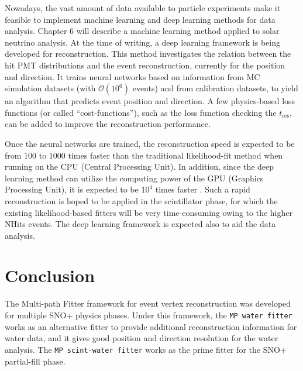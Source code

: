 Nowadays, the vast amount of data available to particle experiments make it feasible to implement machine learning and deep learning methods for data analysis. Chapter 6 will describe a machine learning method applied to solar neutrino analysis. At the time of writing, a deep learning framework is being developed for reconstruction\cite{markMachineLearning,markNeuralTalk,markNeuralNetwork}. This method investigates the relation between the hit PMT distributions and the event reconstruction, currently for the position and direction. It trains neural networks based on information from MC simulation datasets (with $\mathcal{O}(10^6)$ events) and from calibration datasets, to yield an algorithm that predicts event position and direction\cite{markNeuralTalk}. A few physics-based loss functions (or called ``cost-functions''), such as the loss function checking the $t_\mathrm{res}$, can be added to improve the reconstruction performance\cite{markNeuralTalk}. 

Once the neural networks are trained, the reconstruction speed is expected to be from 100 to 1000 times faster than the traditional likelihood-fit method when running on the CPU (Central Processing Unit). In addition, since the deep learning method can utilize the computing power of the GPU (Graphics Processing Unit), it is expected to be $10^4$ times faster \cite{markNeuralTalk,markNeuralNetwork}. Such a rapid reconstruction is hoped to be applied in the scintillator phase, for which the existing likelihood-based fitters will be very time-consuming owing to the higher NHits events. The deep learning framework is expected also to aid the data analysis.

\section{Conclusion}

The Multi-path Fitter framework for event vertex reconstruction was developed for multiple SNO+ physics phases. Under this framework, the \texttt{MP water fitter} works as an alternative fitter to provide additional reconstruction information for water data, and it gives good position and direction resolution for the water analysis. The \texttt{MP scint-water fitter} works as the prime fitter for the SNO+ partial-fill phase.
